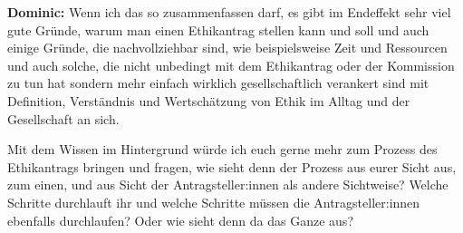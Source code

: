\documentclass[a4paper,12pt,twoside,numbers=noendperiod]{scrreprt}
\begin{document}
\textbf{Dominic:} Wenn ich das so zusammenfassen darf, es gibt im Endeffekt sehr viel gute Gründe, warum man einen Ethikantrag stellen kann und soll und auch einige Gründe, die nachvollziehbar sind, wie beispielsweise Zeit und Ressourcen und auch solche, die nicht unbedingt mit dem Ethikantrag oder der Kommission zu tun hat sondern mehr einfach wirklich gesellschaftlich verankert sind mit Definition, Verständnis und Wertschätzung von Ethik im Alltag und der Gesellschaft an sich.

Mit dem Wissen im Hintergrund würde ich euch gerne mehr zum Prozess des Ethikantrags bringen und fragen, wie sieht denn der Prozess aus eurer Sicht aus, zum einen, und aus Sicht der Antragsteller:innen als andere Sichtweise? Welche Schritte durchlauft ihr und welche Schritte müssen die Antragsteller:innen ebenfalls durchlaufen? Oder wie sieht denn da das Ganze aus?
\end{document}
